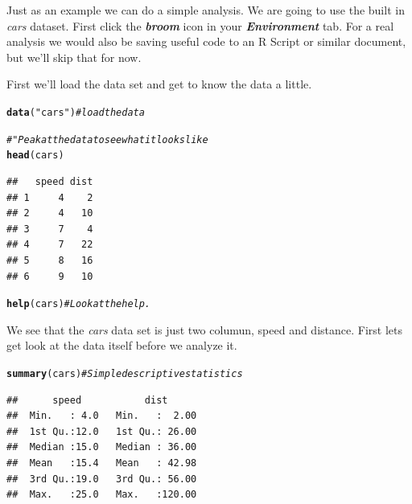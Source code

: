 \documentclass{article}\usepackage[]{graphicx}\usepackage[]{color}
\makeatletter
\newcommand{\hlstr}[1]{\textcolor[rgb]{0.192,0.494,0.8}{#1}}%
\newcommand{\hlcom}[1]{\textcolor[rgb]{0.678,0.584,0.686}{\textit{#1}}}%
\newcommand{\hlstd}[1]{\textcolor[rgb]{0.345,0.345,0.345}{#1}}%
\newcommand{\hlkwd}[1]{\textcolor[rgb]{0.737,0.353,0.396}{\textbf{#1}}}%
\newenvironment{kframe}{%
 \def\at@end@of@kframe{}%
 \ifinner\ifhmode%
  \def\at@end@of@kframe{\end{minipage}}%
  \begin{minipage}{\columnwidth}%
 \fi\fi%
 \def\FrameCommand##1{\hskip\@totalleftmargin \hskip-\fboxsep
 \colorbox{shadecolor}{##1}\hskip-\fboxsep
     \hskip-\linewidth \hskip-\@totalleftmargin \hskip\columnwidth}%
 \MakeFramed {\advance\hsize-\width
   \@totalleftmargin\z@ \linewidth\hsize
   \@setminipage}}%
 {\par\unskip\endMakeFramed%
 \at@end@of@kframe}
\newenvironment{knitrout}{}{} %
\makeatother
\begin{document}
  Just as an example we can do a simple analysis. We are going to use the built in \textit{cars} dataset. First click the \textbf{\textit{broom}} icon in your \textbf{\textit{Environment}} tab. For a real analysis we would also be saving useful code to an R Script or similar document, but we'll skip that for now.
  
  First we'll load the data set and get to know the data a little.
  
  
\begin{knitrout}
\color{fgcolor}\begin{kframe}
\begin{alltt}
  \hlkwd{data}\hlstd{(}\hlstr{"cars"}\hlstd{)}  \hlcom{# load the data }

  \hlcom{# "Peak at the data to see what it looks like}
  \hlkwd{head}\hlstd{(cars)}
\end{alltt}
\begin{verbatim}
##   speed dist
## 1     4    2
## 2     4   10
## 3     7    4
## 4     7   22
## 5     8   16
## 6     9   10
\end{verbatim}
\begin{alltt}
  \hlkwd{help}\hlstd{(cars)}  \hlcom{# Look at the help.}
\end{alltt}
\end{kframe}
\end{knitrout}
  
   We see that the \textit{cars} data set is just two columun, speed and distance. First lets get look at the data itself before we analyze it.
  
\begin{knitrout}
\color{fgcolor}\begin{kframe}
\begin{alltt}
    \hlkwd{summary}\hlstd{(cars)} \hlcom{# Simple descriptive statistics}
\end{alltt}
\begin{verbatim}
##      speed           dist       
##  Min.   : 4.0   Min.   :  2.00  
##  1st Qu.:12.0   1st Qu.: 26.00  
##  Median :15.0   Median : 36.00  
##  Mean   :15.4   Mean   : 42.98  
##  3rd Qu.:19.0   3rd Qu.: 56.00  
##  Max.   :25.0   Max.   :120.00
\end{verbatim}
\end{kframe}
\end{knitrout}
  
\end{document}
